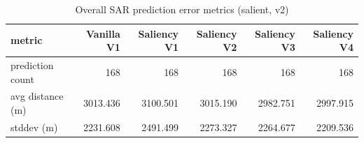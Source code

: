 \begin{table}[ht]
\centering
\caption{Overall SAR prediction error metrics (salient, v2)}
\label{tab:sar-overall-errors-salient,-v2}
\begin{tabular}{lrrrrr}
\hline
metric & Vanilla V1 & Saliency V1 & Saliency V2 & Saliency V3 & Saliency V4 \\
\hline
prediction count & 168 & 168 & 168 & 168 & 168 \\
avg distance (m) & 3013.436 & 3100.501 & 3015.190 & 2982.751 & 2997.915 \\
stddev (m) & 2231.608 & 2491.499 & 2273.327 & 2264.677 & 2209.536 \\
\hline
\end{tabular}
\end{table}
